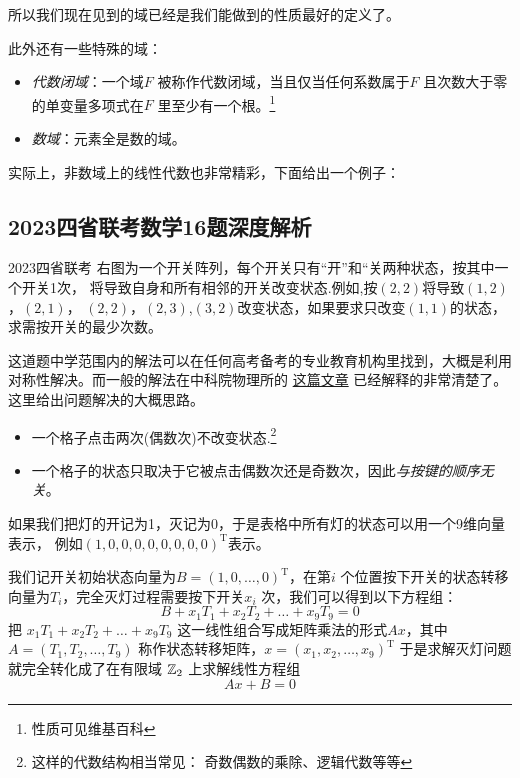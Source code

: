 所以我们现在见到的域已经是我们能做到的性质最好的定义了。

此外还有一些特殊的域：
\begin{itemize}
    \item \emph{代数闭域}：一个域\(F\) 被称作代数闭域，当且仅当任何系数属于\(F\)
        且次数大于零的单变量多项式在\(F\) 里至少有一个根。\footnote{性质可见维基百科}
    \item \emph{数域}：元素全是数的域。
\end{itemize}
实际上，非数域上的线性代数也非常精彩，下面给出一个例子：

\subsection{2023四省联考数学16题深度解析}

\begin{problem}{2023四省联考}
    右图为一个开关阵列，每个开关只有“开”和“关两种状态，按其中一个开关1次，
    将导致自身和所有相邻的开关改变状态.例如,按\((2,2)\)将导致\((1,2)\)，\((2,1)\)，
    \((2,2)\)，\((2,3)\),\((3,2)\)改变状态，如果要求只改变\((1,1)\)的状态，求需按开关的最少次数。
\end{problem}

这道题中学范围内的解法可以在任何高考备考的专业教育机构里找到，大概是利用对称性解决。而一般的解法在中科院物理所的
\href{https://mp.weixin.qq.com/s/k15Xlib2k9JOVrvBifQoiQ}{这篇文章}
已经解释的非常清楚了。这里给出问题解决的大概思路。

\begin{itemize}
    \item 一个格子点击两次(偶数次)不改变状态.\footnote{这样的代数结构相当常见： 奇数偶数的乘除、逻辑代数等等}
    \item 一个格子的状态只取决于它被点击偶数次还是奇数次，因此\emph{与按键的顺序无关}。
\end{itemize}

如果我们把灯的开记为1，灭记为0，于是表格中所有灯的状态可以用一个9维向量表示，
例如\((1,0,0,0,0,0,0,0,0)^{\mathrm{T}}\)表示。

我们记开关初始状态向量为\(B=(1,0,\dots,0)^{\mathrm{T}}\)，在第\(i\)
个位置按下开关的状态转移向量为\(T_{i}\)，完全灭灯过程需要按下开关\(x_{i}\) 次，我们可以得到以下方程组：
\[
    B+ x_{1}T_{1}+x_{2}T_{2}+\dots+x_{9}T_{9}=0
\]
把 \(x_{1}T_{1}+x_{2}T_{2}+\dots+x_{9}T_{9}\)
这一线性组合写成矩阵乘法的形式\(Ax\)，其中\(A=(T_{1}, T_{2}, \dots,
T_{9})\) 称作状态转移矩阵，\(x=(x_{1}, x_{2}, \dots, x_{9})^{\mathrm{T}}\)
于是求解灭灯问题就完全转化成了在有限域
\(\mathbb{Z}_{2}\) 上求解线性方程组\[
    Ax+B=0
\]

